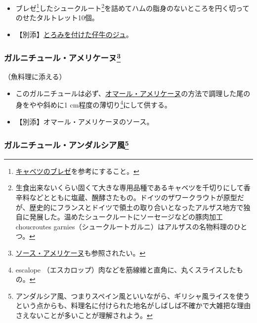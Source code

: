 \begin{recette}
\begin{itemize}
\item
  ブレゼ\footnote{\protect\hyperlink{chou-braise}{キャベツのブレゼ}を参考にすること。}したシュークルート\footnote{生食出来ないくらい固くて大きな専用品種であるキャベツを千切りにして香辛料などとともに塩蔵、醗酵さたもの。ドイツのザワークラウトが原型だが、歴史的にフランスとドイツで領土の取り合いとなったアルザス地方で独自に発展した。温めたシュークルートにソーセージなどの豚肉加工
    choucroutes
    garnies（シュークルートガルニ）はアルザスの名物料理のひとつ。}を詰めてハムの脂身のないところを円く切ってのせたタルトレット10個。
\item
  【別添】\protect\hyperlink{jus-de-veau-lie}{とろみを付けた仔牛のジュ}。
\end{itemize}

\atoaki{}

\hypertarget{garniture-americaine}{%
\subsubsection[ガルニチュール・アメリケーヌ]{\texorpdfstring{ガルニチュール・アメリケーヌ\footnote{\protect\hyperlink{sauce-americaine}{ソース・アメリケーヌ}も参照されたい。}}{ガルニチュール・アメリケーヌ}}\label{garniture-americaine}}



（魚料理に添える）

\begin{itemize}
\item
  このガルニチュールは必ず、\protect\hyperlink{homard-americaine}{オマール・アメリケーヌ}の方法で調理した尾の身をやや斜めに1
  cm程度の薄切り\footnote{escalope
    （エスカロップ）肉などを筋線維と直角に、丸くスライスしたもの。}にして供する。
\item
  【別添】オマール・アメリケーヌのソース。
\end{itemize}

\atoaki{}

\hypertarget{garniture-andalouse}{%
\subsubsection[ガルニチュール・アンダルシア風]{\texorpdfstring{ガルニチュール・アンダルシア風\footnote{アンダルシア風、つまりスペイン風といいながら、ギリシャ風ライスを使うという点からも、料理名に付けられた地名がしばしば不確かで大雑把な理由さえないことが多いことが理解されよう。}}{ガルニチュール・アンダルシア風}}\label{garniture-andalouse}}


\end{recette}
